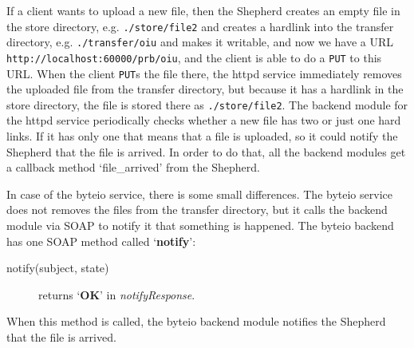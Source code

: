 \documentclass{book}
\begin{document}
If a client wants to upload a new file, then the Shepherd creates an empty file in the store directory, e.g. \verb!./store/file2! and creates a hardlink into the transfer directory, e.g. \verb!./transfer/oiu! and makes it writable, and now we have a URL \verb!http://localhost:60000/prb/oiu!, and the client is able to do a \verb!PUT! to this URL. When the client \verb!PUT!s the file there, the httpd service immediately removes the uploaded file from the transfer directory, but because it has a hardlink in the store directory, the file is stored there as \verb!./store/file2!. The backend module for the httpd service periodically checks whether a new file has two or just one hard links. If it has only one that means that a file is uploaded, so it could notify the Shepherd that the file is arrived. In order to do that, all the backend modules get a callback method `file\_arrived' from the Shepherd.

In case of the byteio service, there is some small differences. The byteio service does not removes the files from the transfer directory, but it calls the backend module via SOAP to notify it that something is happened. The byteio backend has one SOAP method called `\textbf{notify}':
\begin{description}
    \item[notify(subject, state)] returns `\textbf{OK}' in \emph{notifyResponse}.
\end{description}
When this method is called, the byteio backend module notifies the Shepherd that the file is arrived.
\end{document}
